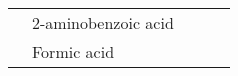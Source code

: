 \begin{table}[]
\begin{tabular}{@{}lllll@{}}
                                                                                                 & 2-aminobenzoic acid                                                                                   &                                                                                                      &                                                                                              &                                                                                                                                                                                                                                                                                                                                                                                                                                                                                                                                                                                                                                                                                                                                                                                                                                                                                                                           \\
                                                                                                 & Formic acid                                                                                           &                                                                                                      &                                                                                              &                                                                                                                                                                                                                                                                                                                                                                                                                                                                                                                                                                                                                                                                                                                                                                                                                                                                                                                           \\

\end{tabular}
\end{table}

